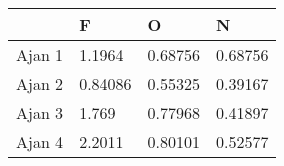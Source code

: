 \begin{tabular}{llll}
& F & O & N \\ 
\hline 
Ajan 1 & 1.1964 & 0.68756 & 0.68756 \\ 
Ajan 2 & 0.84086 & 0.55325 & 0.39167 \\ 
Ajan 3 & 1.769 & 0.77968 & 0.41897 \\ 
Ajan 4 & 2.2011 & 0.80101 & 0.52577 \\ 
\hline 
\end{tabular}